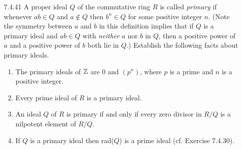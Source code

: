 \begin{enumerate}
\begin{enumerate}
                  \end{enumerate}
   \item[7.4.41]  A proper ideal $Q$ of the commutative ring $R$ is called
                  \textit{primary} if whenever $ab \in Q$ and $a \notin Q$ then
                  $b^n \in Q$ for some positive integer $n$. (Note the symmetry
                  between $a$ and $b$ in this definition implies that if $Q$ is
                  a primary ideal and $ab \in Q$ with \textit{neither} $a$ nor
                  $b$ in $Q$, then a positive power of $a$ and a positive power
                  of $b$ both lie in $Q$.) Establish the following facts about
                  primary ideals.
                  \begin{enumerate}
                     \item The primary ideals of $\mathbb{Z}$ are 0 and $(p^n)$, where
                           $p$ is a prime and $n$ is a positive integer.
                     \item Every prime ideal of $R$ is a primary ideal.
                     \item An ideal $Q$ of $R$ is primary if and only if every
                           zero divisor in $R/Q$ is a nilpotent element of
                           $R/Q$.
                     \item If $Q$ is a primary ideal then rad($Q$) is a prime
                           ideal (cf. Exercise 7.4.30).
                  \end{enumerate}
\end{enumerate}
